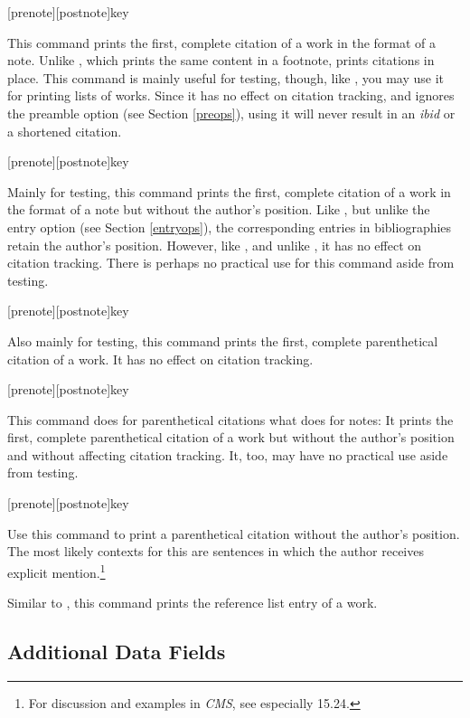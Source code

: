 \documentclass[11pt,letterpaper,oneside]{article}
\begin{document}
\begin{ltxsyntax}
[prenote][postnote]{key}

This command prints the first, complete citation of a work in the
format of a note. Unlike , which prints the same
content in a footnote,  prints citations in place. This
command is mainly useful for testing, though, like , you
may use it for printing lists of works. Since it has no effect on
citation tracking, and ignores the preamble option
 (see Section \ref{preops}), using it will never
result in an \textit{ibid} or a shortened citation.

[prenote][postnote]{key}

Mainly for testing, this command prints the first, complete citation
of a work in the format of a note but without the author's position.
Like , but unlike the entry option  (see
Section \ref{entryops}), the corresponding entries in bibliographies
retain the author's position. However, like , and unlike
, it has no effect on citation tracking. There is perhaps
no practical use for this command aside from testing.

[prenote][postnote]{key}

Also mainly for testing, this command prints the first, complete
parenthetical citation of a work. It has no effect on citation
tracking.

[prenote][postnote]{key}

This command does for parenthetical citations what 
does for notes: It prints the first, complete parenthetical citation
of a work but without the author's position and without affecting
citation tracking. It, too, may have no practical use aside from
testing.

[prenote][postnote]{key}

Use this command to print a parenthetical citation without the
author's position. The most likely contexts for this are sentences in
which the author receives explicit mention.\footnote{For discussion
and examples in \textit{CMS}, see especially 15.24.}


Similar to , this command prints the reference list
entry of a work.

\end{ltxsyntax}

\subsection{Additional Data Fields}
\label{datafields}
\end{document}
